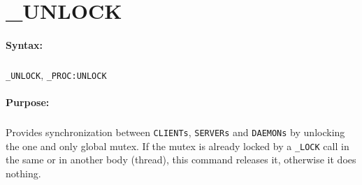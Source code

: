 
\newpage
\section{\_UNLOCK}
\label{cmd:_UNLOCK}

\paragraph{Syntax:}
\subparagraph{}
\texttt{\_UNLOCK}, \texttt{\_PROC:UNLOCK}

\paragraph{Purpose:}
\subparagraph{}
Provides synchronization between \texttt{CLIENTs}, \texttt{SERVERs}
and \texttt{DAEMONs} by unlocking the one and only global mutex.
If the mutex is already locked by a \texttt{\_LOCK} call in the same
or in another body (thread), this command releases it, otherwise it
does nothing.

